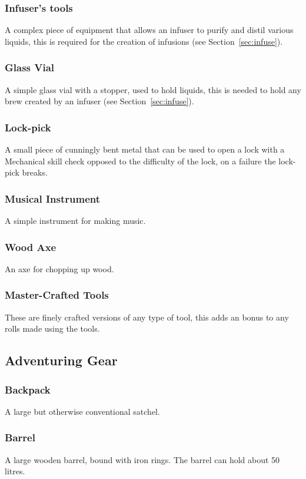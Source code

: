 \documentclass[a4paper,11pt,oneside]{book}
\newcommand{\textlf}[1]{\textbf{\titlecap{#1}}}
\begin{document}
\subsubsection*{Infuser's tools}
A complex piece of equipment that allows an infuser to purify and distil various liquids, this is required for the creation of infusions (see Section~\ref{sec:infuse}).

\subsubsection*{Glass Vial}
A simple glass vial with a stopper, used to hold liquids, this is needed to hold any brew created by an infuser (see Section~\ref{sec:infuse}).

\subsubsection*{Lock-pick}
A small piece of cunningly bent metal that can be used to open a lock with a Mechanical skill check opposed to the difficulty of the lock, on a failure the lock-pick breaks.

\subsubsection*{Musical Instrument}
A simple instrument for making music.

\subsubsection*{Wood Axe}
An axe for chopping up wood.

\subsubsection*{Master-Crafted Tools}
These are finely crafted versions of any type of tool, this adds an \textlf{edge} bonus to any rolls made using the tools.

\subsection{Adventuring Gear}

\subsubsection*{Backpack}
A large but otherwise conventional satchel.

\subsubsection*{Barrel}
A large wooden barrel, bound with iron rings. The barrel can hold about 50 litres.
\end{document}
